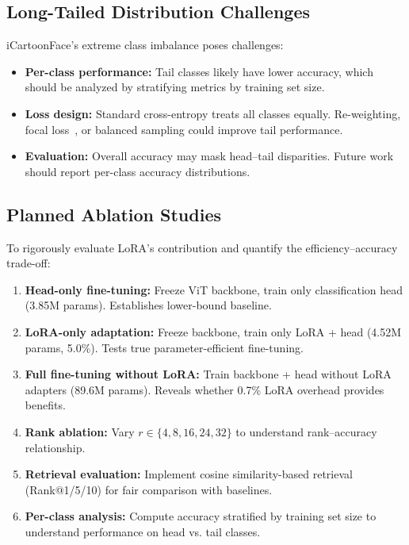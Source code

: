 \documentclass[11pt]{article}
\begin{document}
\subsection{Long-Tailed Distribution Challenges}

iCartoonFace's extreme class imbalance poses challenges:
\begin{itemize}
    \item \textbf{Per-class performance:} Tail classes likely have lower accuracy, which should be analyzed by stratifying metrics by training set size.
    \item \textbf{Loss design:} Standard cross-entropy treats all classes equally. Re-weighting, focal loss~\cite{lin2017focal}, or balanced sampling could improve tail performance.
    \item \textbf{Evaluation:} Overall accuracy may mask head--tail disparities. Future work should report per-class accuracy distributions.
\end{itemize}

\subsection{Planned Ablation Studies}

To rigorously evaluate LoRA's contribution and quantify the efficiency--accuracy trade-off:

\begin{enumerate}
    \item \textbf{Head-only fine-tuning:} Freeze ViT backbone, train only classification head (3.85M params). Establishes lower-bound baseline.

    \item \textbf{LoRA-only adaptation:} Freeze backbone, train only LoRA + head (4.52M params, 5.0\%). Tests true parameter-efficient fine-tuning.

    \item \textbf{Full fine-tuning without LoRA:} Train backbone + head without LoRA adapters (89.6M params). Reveals whether 0.7\% LoRA overhead provides benefits.

    \item \textbf{Rank ablation:} Vary $r \in \{4, 8, 16, 24, 32\}$ to understand rank--accuracy relationship.

    \item \textbf{Retrieval evaluation:} Implement cosine similarity-based retrieval (Rank@1/5/10) for fair comparison with baselines.

    \item \textbf{Per-class analysis:} Compute accuracy stratified by training set size to understand performance on head vs. tail classes.
\end{enumerate}
\end{document}
